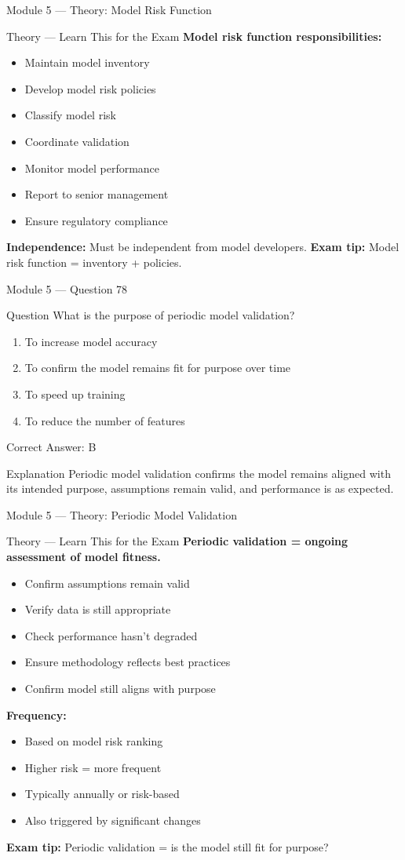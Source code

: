 \documentclass[aspectratio=169,10pt]{beamer}
\newcommand{\question}[1]{%
	\begin{block}{Question}
		#1
	\end{block}
}
\newcommand{\options}[4]{%
	\begin{enumerate}[label=\Alph*.,leftmargin=*]
		\item #1
		\item #2
		\item #3
		\item #4
	\end{enumerate}
}
\newcommand{\answerbox}[1]{%
	\begin{exampleblock}{Correct Answer: #1}
	\end{exampleblock}
}
\newcommand{\explain}[1]{%
	\begin{block}{Explanation}
		\small #1
	\end{block}
}
\newcommand{\theory}[1]{%
	\begin{block}{Theory --- Learn This for the Exam}
		\small #1
	\end{block}
}
\begin{document}
	\begin{frame}{Module 5 --- Theory: Model Risk Function}
		\theory{
			\textbf{Model risk function responsibilities:}
			\begin{itemize}
				\item Maintain model inventory
				\item Develop model risk policies
				\item Classify model risk
				\item Coordinate validation
				\item Monitor model performance
				\item Report to senior management
				\item Ensure regulatory compliance
			\end{itemize}
			\textbf{Independence:} Must be independent from model developers.
			\textbf{Exam tip:} Model risk function = inventory + policies.
		}
	\end{frame}
	
	\begin{frame}{Module 5 --- Question 78}
		\question{What is the purpose of periodic model validation?}
		\options{To increase model accuracy}{To confirm the model remains fit for purpose over time}{To speed up training}{To reduce the number of features}
		\answerbox{B}
		\explain{Periodic model validation confirms the model remains aligned with its intended purpose, assumptions remain valid, and performance is as expected.}
	\end{frame}
	
	\begin{frame}{Module 5 --- Theory: Periodic Model Validation}
		\theory{
			\textbf{Periodic validation = ongoing assessment of model fitness.}
			\begin{itemize}
				\item Confirm assumptions remain valid
				\item Verify data is still appropriate
				\item Check performance hasn't degraded
				\item Ensure methodology reflects best practices
				\item Confirm model still aligns with purpose
			\end{itemize}
			\textbf{Frequency:}
			\begin{itemize}
				\item Based on model risk ranking
				\item Higher risk = more frequent
				\item Typically annually or risk-based
				\item Also triggered by significant changes
			\end{itemize}
			\textbf{Exam tip:} Periodic validation = is the model still fit for purpose?
		}
	\end{frame}
	
\end{document}
